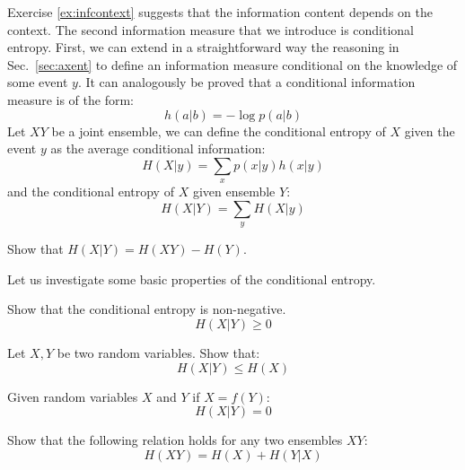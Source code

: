 Exercise \ref{ex:infcontext} suggests that the information content depends on the context. The second information measure that we introduce is conditional entropy.
First, we can extend in a straightforward way the reasoning in Sec.~\ref{sec:axent} to define an information measure conditional on the knowledge of some event $y$. 
It can analogously be proved that a conditional information measure is of the form: 
\begin{equation}
h(a|b) = -\log p (a|b)
\end{equation}
Let $XY$ be a joint ensemble, we can define the conditional entropy of $X$ given the event $y$ as the average conditional information:
\begin{equation}
H({X}|y) = \sum_x p(x|y) h(x|y)
\end{equation}
and the conditional entropy of $X$ given ensemble $Y$:
\begin{equation}
H({X}|{Y})=\sum_yH(X|y)
\end{equation}
\begin{exercise}
Show that $H(X|Y)=H(XY)-H(Y)$.
\end{exercise}
Let us investigate some basic properties of the conditional entropy.
\begin{exercise}
\label{ex:condentpos}
Show that the conditional entropy is non-negative.
\begin{equation*}
H({X}|{Y}) \geq 0
\end{equation*}
\end{exercise}

\begin{exercise}
\label{ex:entgeqcond}
Let $X,Y$ be two random variables. Show that:
\begin{equation*}
H({X}|{Y}) \leq H({X})
\end{equation*}
\end{exercise}

\begin{exercise}
\label{ex:function}
Given random variables ${X}$ and ${Y}$ if ${X}=f({Y})$: 
\begin{equation*}
H({X}|{Y}) = 0
\end{equation*}
\end{exercise}


\begin{exercise} 
\label{ex:chainrule}
Show that the following relation holds for any two ensembles $XY$:
\begin{equation*}
H({XY}) = H({X}) + H({Y}|{X})
\end{equation*}
\end{exercise}

